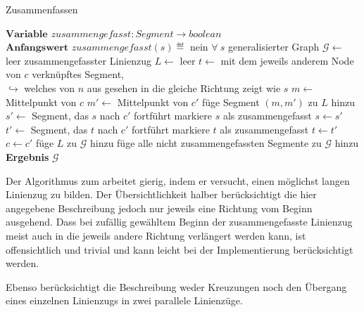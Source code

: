 \documentclass[../main/thesis.tex]{subfiles}
\begin{document}
\begin{algorithmhere}{Zusammenfassen}
\label{alg:Zusammenfassen}
\begin{algorithmic}
\State $\textbf{Variable } zusammengefasst : Segment \rightarrow boolean$
\State $\textbf{Anfangswert } zusammengefasst(s) \eqdef$ nein $\forall\ s$
	\State generalisierter Graph $\mathcal{G} \gets$ leer
			\State zusammengefasster Linienzug $L \gets$ leer
			\State $t \gets$ mit dem jeweils anderem Node von $c$ verknüpftes Segment,\\\qquad\qquad\qquad\quad$\hookrightarrow$ welches von $n$ aus gesehen in die gleiche Richtung zeigt wie $s$
				\State $m \gets$ Mittelpunkt von $c$
				\State $m' \gets$ Mittelpunkt von $c'$
				\State füge Segment $(m, m')$ zu $L$ hinzu
				\State $s' \gets$ Segment, das $s$ nach $c'$ fortführt
					\State markiere $s$ als zusammengefasst
					\State $s \gets s'$
				\EndIf
				\State $t' \gets$ Segment, das $t$ nach $c'$ fortführt
					\State markiere $t$ als zusammengefasst
					\State $t \gets t'$
				\EndIf
				\State $c \gets c'$
			\EndWhile
			\State füge $L$ zu $\mathcal{G}$ hinzu
		\EndFor
	\EndFor
	\State füge alle nicht zusammengefassten Segmente zu $\mathcal{G}$ hinzu
	\State \textbf{Ergebnis} $\mathcal{G}$
\EndFunction
\end{algorithmic}
\end{algorithmhere}

Der Algorithmus zum  arbeitet gierig, indem er versucht, einen möglichst langen Linienzug zu bilden.
Der Übersichtlichkeit halber berücksichtigt die hier angegebene Beschreibung jedoch nur jeweils eine Richtung vom Beginn ausgehend.
Dass bei zufällig gewähltem Beginn der zusammengefasste Linienzug meist auch in die jeweils andere Richtung verlängert werden kann, ist offensichtlich und trivial und kann leicht bei der Implementierung berücksichtigt werden.

Ebenso berücksichtigt die Beschreibung weder Kreuzungen noch den Übergang eines einzelnen Linienzugs in zwei parallele Linienzüge.
\end{document}
